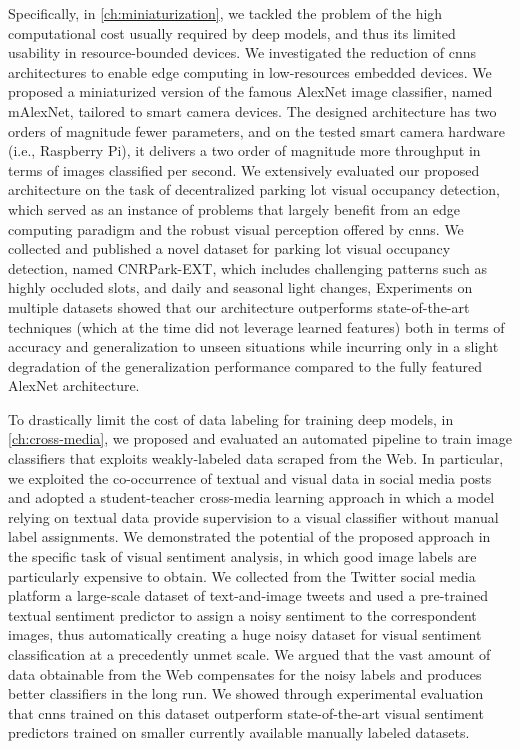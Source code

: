 Specifically, in \ref{ch:miniaturization}, we tackled the problem of the high computational cost usually required by deep models, and thus its limited usability in resource-bounded devices.
We investigated the reduction of \glspl{cnn} architectures to enable edge computing in low-resources embedded devices.
We proposed a miniaturized version of the famous AlexNet image classifier, named mAlexNet, tailored to smart camera devices.
The designed architecture has two orders of magnitude fewer parameters, and on the tested smart camera hardware (i.e., Raspberry Pi), it delivers a two order of magnitude more throughput in terms of images classified per second.
We extensively evaluated our proposed architecture on the task of decentralized parking lot visual occupancy detection, which served as an instance of problems that largely benefit from an edge computing paradigm and the robust visual perception offered by \glspl{cnn}.
We collected and published a novel dataset for parking lot visual occupancy detection, named CNRPark-EXT, which includes challenging patterns such as highly occluded slots, and daily and seasonal light changes,
Experiments on multiple datasets showed that our architecture outperforms state-of-the-art techniques (which at the time did not leverage learned features) both in terms of accuracy and generalization to unseen situations while incurring only in a slight degradation of the generalization performance compared to the fully featured AlexNet architecture.

To drastically limit the cost of data labeling for training deep models, in \ref{ch:cross-media}, we proposed and evaluated an automated pipeline to train image classifiers that exploits weakly-labeled data scraped from the Web.
In particular, we exploited the co-occurrence of textual and visual data in social media posts and adopted a student-teacher cross-media learning approach in which a model relying on textual data provide supervision to a visual classifier without manual label assignments.
We demonstrated the potential of the proposed approach in the specific task of visual sentiment analysis, in which good image labels are particularly expensive to obtain.
We collected from the Twitter social media platform a large-scale dataset of text-and-image tweets and used a pre-trained textual sentiment predictor to assign a noisy sentiment to the correspondent images, thus automatically creating a huge noisy dataset for visual sentiment classification at a precedently unmet scale.
We argued that the vast amount of data obtainable from the Web compensates for the noisy labels and produces better classifiers in the long run.
We showed through experimental evaluation that \glspl{cnn} trained on this dataset outperform state-of-the-art visual sentiment predictors trained on smaller currently available manually labeled datasets.

